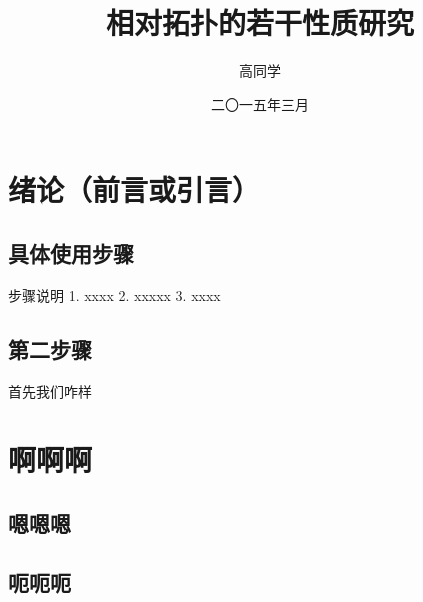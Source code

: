 \documentclass[forprint]{HNUthesis}
\begin{document}

\title{相对拓扑的若干性质研究}                %
\author{高同学}                               %
\date{二〇一五年三月}                         %

\maketitle


\tableofcontents
\thispagestyle{empty}

\frontmatter  %

\mainmatter   %

\baselineskip=21pt  %

\chapter{绪论（前言或引言）}

\section{具体使用步骤}

步骤说明
1. xxxx
2. xxxxx
3. xxxx

\section{第二步骤}

首先我们咋样

\chapter{啊啊啊}

\section{嗯嗯嗯}

\section{呃呃呃}
\end{document}
